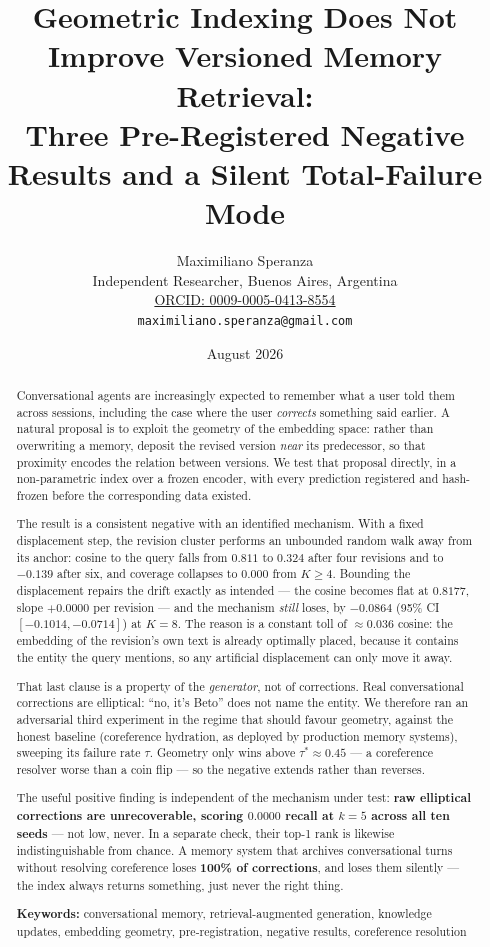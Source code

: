 \documentclass[11pt,a4paper]{article}
\title{\bfseries Geometric Indexing Does Not Improve Versioned Memory Retrieval:\\
Three Pre-Registered Negative Results and a Silent Total-Failure Mode}
\author{Maximiliano Speranza\\
\small Independent Researcher, Buenos Aires, Argentina\\
\small \href{https://orcid.org/0009-0005-0413-8554}{ORCID: 0009-0005-0413-8554}\\
\small \texttt{maximiliano.speranza@gmail.com}}
\date{August 2026}
\begin{document}
\maketitle

\begin{abstract}
\noindent
Conversational agents are increasingly expected to remember what a user told them across sessions,
including the case where the user \emph{corrects} something said earlier. A natural proposal is to
exploit the geometry of the embedding space: rather than overwriting a memory, deposit the revised
version \emph{near} its predecessor, so that proximity encodes the relation between versions. We test
that proposal directly, in a non-parametric index over a frozen encoder, with every prediction
registered and hash-frozen before the corresponding data existed.

The result is a consistent negative with an identified mechanism. With a fixed displacement step, the
revision cluster performs an unbounded random walk away from its anchor: cosine to the query falls
from $0.811$ to $0.324$ after four revisions and to $-0.139$ after six, and coverage collapses to
$0.000$ from $K \geq 4$. Bounding the displacement repairs the drift exactly as intended --- the
cosine becomes flat at $0.8177$, slope $+0.0000$ per revision --- and the mechanism \emph{still}
loses, by $-0.0864$ (95\% CI $[-0.1014, -0.0714]$) at $K=8$. The reason is a constant toll of
$\approx 0.036$ cosine: the embedding of the revision's own text is already optimally placed, because
it contains the entity the query mentions, so any artificial displacement can only move it away.

That last clause is a property of the \emph{generator}, not of corrections. Real conversational
corrections are elliptical: ``no, it's Beto'' does not name the entity. We therefore ran an
adversarial third experiment in the regime that should favour geometry, against the honest baseline
(coreference hydration, as deployed by production memory systems), sweeping its failure rate $\tau$.
Geometry only wins above $\tau^{*} \approx 0.45$ --- a coreference resolver worse than a coin flip ---
so the negative extends rather than reverses.

The useful positive finding is independent of the mechanism under test: \textbf{raw elliptical
corrections are unrecoverable, scoring $0.0000$ recall at $k=5$ across all ten seeds} --- not low,
never. In a separate check, their top-1 rank is likewise indistinguishable from chance. A memory
system that archives conversational turns without resolving coreference loses \textbf{100\% of
corrections}, and loses them silently --- the index always returns something, just never the right
thing.

\vspace{0.6em}
\noindent\textbf{Keywords:} conversational memory, retrieval-augmented generation, knowledge updates,
embedding geometry, pre-registration, negative results, coreference resolution
\end{abstract}
\end{document}
